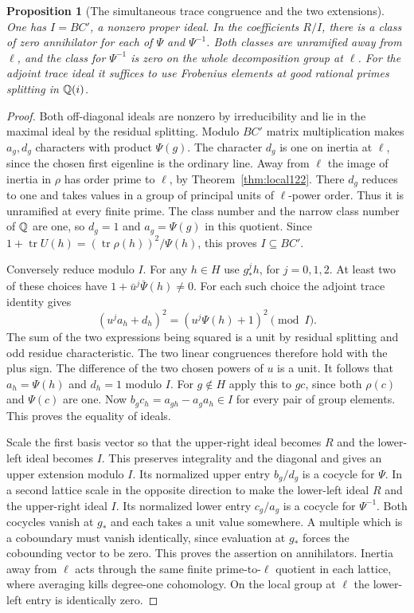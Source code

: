 \documentclass[a4paper,11pt]{article}
\newtheorem{proposition}{Proposition}[section]
\theoremstyle{definition}
\theoremstyle{remark}
\numberwithin{equation}{section}
\begin{document}
\begin{proposition}[The simultaneous trace congruence and the two extensions]\leavevmode
\label{prop:traceideal306}
One has \(I=BC'\), a nonzero proper ideal. In the coefficients
\(R/I\), there is a class of zero annihilator for each of
\(\Psi\) and \(\Psi^{-1}\). Both classes are unramified away
from \(\ell\), and the class for \(\Psi^{-1}\) is zero on the
whole decomposition group at \(\ell\). For the adjoint trace
ideal it suffices to use Frobenius elements at good rational
primes splitting in \(\mathbb Q(i)\).
\end{proposition}
\begin{proof}
Both off-diagonal ideals are nonzero by irreducibility and lie
in the maximal ideal by the residual splitting. Modulo \(BC'\)
matrix multiplication makes \(a_g,d_g\) characters with
product \(\Psi(g)\). The character \(d_g\) is one on inertia
at \(\ell\), since the chosen first eigenline is the ordinary
line. Away from \(\ell\) the image of inertia in \(\rho\)
has order prime to \(\ell\), by Theorem~\ref{thm:local122}.
There \(d_g\) reduces to one and takes values in a group of
principal units of \(\ell\)-power order. Thus it is unramified
at every finite prime. The class number and the narrow class
number of \(\mathbb Q\) are one, so \(d_g=1\) and \(a_g=\Psi(g)\)
in this quotient. Since
\(1+\operatorname{tr}U(h)=(\operatorname{tr}\rho(h))^2/\Psi(h)\),
this proves \(I\subseteq BC'\).

Conversely reduce modulo \(I\). For any \(h\in H\) use
\(g_*^j h\), for \(j=0,1,2\). At least two of these choices
have \(1+\bar u^j\bar\Psi(h)\ne0\). For each such choice the
adjoint trace identity gives
\[
 (u^j a_h+d_h)^2=(u^j\Psi(h)+1)^2\pmod I .
\]
The sum of the two expressions being squared is a unit by
residual splitting and odd residue characteristic. The two
linear congruences therefore hold with the plus sign. The
difference of the two chosen powers of \(u\) is a unit. It
follows that \(a_h=\Psi(h)\) and \(d_h=1\) modulo \(I\).
For \(g\notin H\) apply this to \(gc\), since both \(\rho(c)\)
and \(\Psi(c)\) are one. Now
\(b_g c_h=a_{gh}-a_g a_h\in I\) for every pair of group
elements. This proves the equality of ideals.

Scale the first basis vector so that the upper-right ideal
becomes \(R\) and the lower-left ideal becomes \(I\). This
preserves integrality and the diagonal and gives an upper
extension modulo \(I\). Its normalized upper entry
\(b_g/d_g\) is a cocycle for \(\Psi\). In a second lattice
scale in the opposite direction to make the lower-left ideal
\(R\) and the upper-right ideal \(I\). Its normalized lower
entry \(c_g/a_g\) is a cocycle for \(\Psi^{-1}\). Both cocycles
vanish at \(g_*\) and each takes a unit value somewhere.
A multiple which is a coboundary must vanish identically,
since evaluation at \(g_*\) forces the cobounding vector to be
zero. This proves the assertion on annihilators. Inertia away
from \(\ell\) acts through the same finite prime-to-\(\ell\)
quotient in each lattice, where averaging kills degree-one
cohomology. On the local group at \(\ell\) the lower-left
entry is identically zero.


\end{proof}
\end{document}
